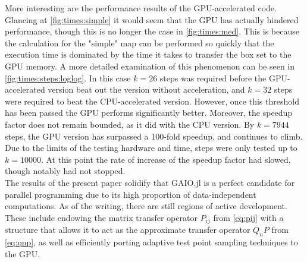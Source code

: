 More interesting are the performance results of the GPU-accelerated code. Glancing at 
\autoref{fig:times:simple} it would seem that the GPU has actually hindered 
performance, though this is no longer the case in \autoref{fig:times:med}. This is 
because the calculation for the "simple" map can be performed so quickly that the 
execution time is dominated by the time it takes to transfer the box set to the GPU 
memory. A more detailed examination of this phenomenon can be seen in 
\autoref{fig:times:steps:loglog}. In this case $k = 26$ steps was required before the 
GPU-accelerated version beat out the version without acceleration, and $k = 32$ steps were 
required to beat the CPU-accelerated version. However, once this threshold has been 
passed the GPU performs significantly better. Moreover, the speedup factor does not remain 
bounded, as it did with the CPU version. By $k = 7944$ steps, the GPU version has 
surpassed a 100-fold speedup, and continues to climb. Due to the limits of the testing 
hardware and time, steps were only tested up to $k = 10000$. At this point the rate of 
increase of the speedup factor had slowed, though notably had not stopped. \\

The results of the present paper solidify that GAIO.jl is a perfect candidate for 
parallel programming due to its high proportion of data-independent computations. As of 
the writing, there are still regions of active development. These include endowing the 
matrix transfer operator $P_{ij}$ from \autoref{eq:pij} with a structure that allows it to 
act as the approximate transfer operator $Q_n P$ from \autoref{eq:qnp}, as well as 
efficiently porting adaptive test point sampling techniques to the GPU. 

